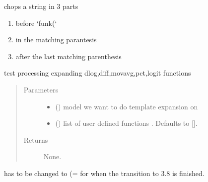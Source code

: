 \documentclass[letterpaper,10pt,english]{sphinxmanual}
\begin{document}
\begin{fulllineitems}
\label{\detokenize{index:modelnormalize.funk_find_arg}}
\pysigstartsignatures
{}
\pysigstopsignatures
\sphinxAtStartPar
chops a string in 3 parts
\begin{enumerate}
%
\item {} 
\sphinxAtStartPar
before ‘funk(‘

\item {} 
\sphinxAtStartPar
in the matching parantesis

\item {} 
\sphinxAtStartPar
after the last matching parenthesis

\end{enumerate}

\end{fulllineitems}


\begin{fulllineitems}
\label{\detokenize{index:modelnormalize.preprocess}}
\pysigstartsignatures
{}
\pysigstopsignatures
\sphinxAtStartPar
test processing expanding dlog,diff,movavg,pct,logit functions
\begin{quote}\begin{description}
\item[{Parameters}] \leavevmode\begin{itemize}
\item {} 
\sphinxAtStartPar
{} () \textendash{} model we want to do template expansion on

\item {} 
\sphinxAtStartPar
{} (\sphinxstyleliteralemphasis{\sphinxupquote{, }}) \textendash{} list of user defined functions . Defaults to {[}{]}.

\end{itemize}

\item[{Returns}] \leavevmode
\sphinxAtStartPar
None.

\end{description}\end{quote}

\sphinxAtStartPar
has to be changed to (= for when the transition to 3.8 is finished.

\end{fulllineitems}
\end{document}
